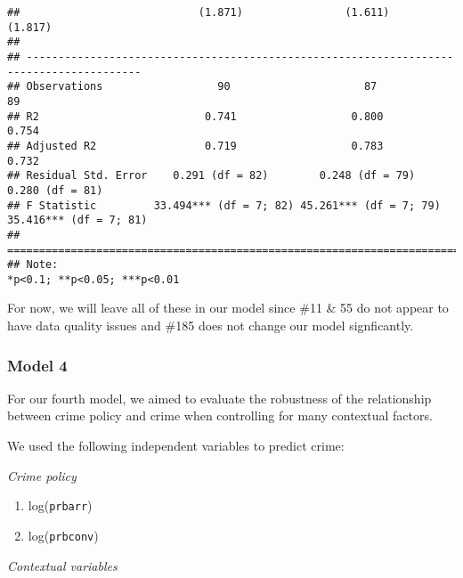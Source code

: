 \documentclass[]{article}
\begin{document}
\begin{verbatim}
##                            (1.871)                (1.611)                (1.817)        
##                                                                                         
## ----------------------------------------------------------------------------------------
## Observations                  90                     87                     89          
## R2                          0.741                  0.800                  0.754         
## Adjusted R2                 0.719                  0.783                  0.732         
## Residual Std. Error    0.291 (df = 82)        0.248 (df = 79)        0.280 (df = 81)    
## F Statistic         33.494*** (df = 7; 82) 45.261*** (df = 7; 79) 35.416*** (df = 7; 81)
## ========================================================================================
## Note:                                                        *p<0.1; **p<0.05; ***p<0.01
\end{verbatim}

For now, we will leave all of these in our model since \#11 \& 55 do not
appear to have data quality issues and \#185 does not change our model
signficantly.

\hypertarget{model-4}{%
\subsubsection{Model 4}\label{model-4}}

For our fourth model, we aimed to evaluate the robustness of the
relationship between crime policy and crime when controlling for many
contextual factors.

We used the following independent variables to predict crime:

\emph{Crime policy}

\begin{enumerate}
\def\labelenumi{(\arabic{enumi})}
\item
  log(\texttt{prbarr})
\item
  log(\texttt{prbconv})
\end{enumerate}

\emph{Contextual variables}
\end{document}
